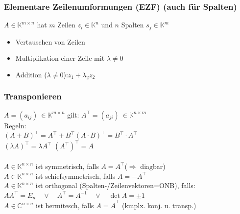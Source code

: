 \documentclass[6pt,a4paper]{scrartcl}
\begin{document}
\begin{multicols*}{4}
\subsubsection{Elementare Zeilenumformungen (EZF) (auch für Spalten)}
$A \in \mathbb K^{m\times n}$ hat $m$ Zeilen $z_i\in \mathbb K^n$ und $n$ Spalten $s_j\in \mathbb K^m$
\begin{itemize}\itemsep0pt
\item Vertauschen von Zeilen
\item Multiplikation einer Zeile mit $\lambda\ne 0$ 
\item Addition ($\lambda\ne 0$):\quad $z_1 + \lambda_2  z_2$
\end{itemize}

\subsubsection{Transponieren}
$A=(a_{ij})\ \in \mathbb K^{m\times n}$ gilt: $A^\top=(a_{ji})\ \in \mathbb K^{n\times m}$\\
Regeln:\\
$(A+B)^\top=A^\top+B^\top$\qquad $(A\cdot B)^\top=B^\top\cdot A^\top$\qquad \\
$(\lambda A)^\top=\lambda A^\top$ \qquad \qquad \qquad $(A^\top)^\top=A$\\
\\
$A\in \mathbb K^{n\times n}$ ist symmetrisch, falls $A=A^\top$\qquad ($\Rightarrow$ diagbar)\\
$A\in \mathbb K^{n\times n}$ ist schiefsymmetrisch, falls $A=-A^\top$\\
$A\in \mathbb K^{n\times n}$ ist orthogonal (Spalten-/Zeilenvektoren=ONB), falls:\\
$AA^\top=E_n \quad \lor \quad A^\top=A^{-1} \quad \lor \quad \det A=\pm 1$\\
$A\in \mathbb C^{n\times n}$ ist hermitesch, falls $A=\overline{A}^\top$  \quad (kmplx. konj. u. transp.)



\end{multicols*}
\end{document}

